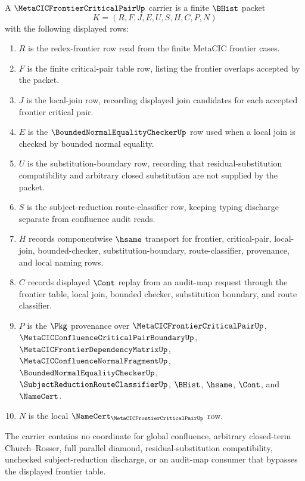 \begin{definition}
\label{def:metacic-frontier-critical-pair-carrier}
A $\MetaCICFrontierCriticalPairUp$ carrier is a finite $\BHist$ packet
$$
K=(R,F,J,E,U,S,H,C,P,N)
$$
with the following displayed rows:
\begin{enumerate}
\item $R$ is the redex-frontier row read from the finite MetaCIC frontier cases.
\item $F$ is the finite critical-pair table row, listing the frontier overlaps accepted by the packet.
\item $J$ is the local-join row, recording displayed join candidates for each accepted frontier critical pair.
\item $E$ is the $\BoundedNormalEqualityCheckerUp$ row used when a local join is checked by bounded normal equality.
\item $U$ is the substitution-boundary row, recording that residual-substitution compatibility and arbitrary closed substitution are not supplied by the packet.
\item $S$ is the subject-reduction route-classifier row, keeping typing discharge separate from confluence audit reads.
\item $H$ records componentwise $\hsame$ transport for frontier, critical-pair, local-join, bounded-checker, substitution-boundary, route-classifier, provenance, and local naming rows.
\item $C$ records displayed $\Cont$ replay from an audit-map request through the frontier table, local join, bounded checker, substitution boundary, and route classifier.
\item $P$ is the $\Pkg$ provenance over $\MetaCICFrontierCriticalPairUp$, $\MetaCICConfluenceCriticalPairBoundaryUp$, $\MetaCICFrontierDependencyMatrixUp$, $\MetaCICConfluenceNormalFragmentUp$, $\BoundedNormalEqualityCheckerUp$, $\SubjectReductionRouteClassifierUp$, $\BHist$, $\hsame$, $\Cont$, and $\NameCert$.
\item $N$ is the local $\NameCert_{\MetaCICFrontierCriticalPairUp}$ row.
\end{enumerate}
The carrier contains no coordinate for global confluence, arbitrary closed-term Church--Rosser, full parallel diamond, residual-substitution compatibility, unchecked subject-reduction discharge, or an audit-map consumer that bypasses the displayed frontier table.
\end{definition}

